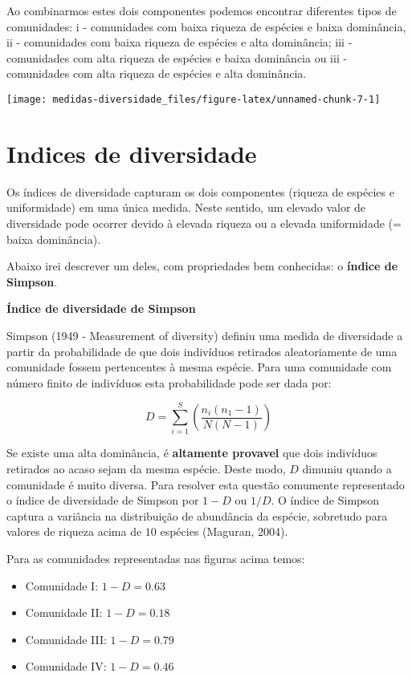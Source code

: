 \documentclass[
]{book}
\begin{document}
Ao combinarmos estes dois componentes podemos encontrar diferentes tipos de comunidades: i - comunidades com baixa riqueza de espécies e baixa dominância, ii - comunidades com baixa riqueza de espécies e alta dominância; iii - comunidades com alta riqueza de espécies e baixa dominância ou iii - comunidades com alta riqueza de espécies e alta dominância.

\begin{center}\texttt{[image: medidas-diversidade\_files/figure-latex/unnamed-chunk-7-1]} \end{center}

\hypertarget{indices-de-diversidade}{%
\section{Indices de diversidade}\label{indices-de-diversidade}}

Os índices de diversidade capturam os dois componentes (riqueza de espécies e uniformidade) em uma única medida. Neste sentido, um elevado valor de diversidade pode ocorrer devido à elevada riqueza ou a elevada uniformidade (= baixa dominância).

Abaixo irei descrever um deles, com propriedades bem conhecidas: o \textbf{índice de Simpson}.

\textbf{Índice de diversidade de Simpson}

Simpson (1949 - Measurement of diversity) definiu uma medida de diversidade a partir da probabilidade de que dois indivíduos retirados aleatoriamente de uma comunidade fossem pertencentes à mesma espécie. Para uma comunidade com número finito de indivíduos esta probabilidade pode ser dada por:

\[D = \sum_{i = 1}^{S}\left(\frac{n_i(n_1 - 1)}{N(N-1)}\right)\]

Se existe uma alta dominância, é \textbf{altamente provavel} que dois indivíduos retirados ao acaso sejam da mesma espécie. Deste modo, \(D\) dimuniu quando a comunidade é muito diversa. Para resolver esta questão comumente representado o índice de diversidade de Simpson por \(1 - D\) ou \(1/D\). O índice de Simpson captura a variância na distribuição de abundância da espécie, sobretudo para valores de riqueza acima de \(10\) espécies (Maguran, 2004).

Para as comunidades representadas nas figuras acima temos:

\begin{itemize}
\item
  Comunidade I: \(1 - D = 0.63\)
\item
  Comunidade II: \(1 - D = 0.18\)
\item
  Comunidade III: \(1 - D = 0.79\)
\item
  Comunidade IV: \(1 - D = 0.46\)
\end{itemize}
\end{document}
